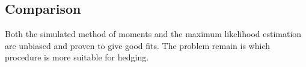 %
%

\subsection{Comparison}
Both the simulated method of moments and the maximum likelihood estimation are unbiased and
proven to give good fits.
The problem remain is which procedure is more suitable for hedging.

